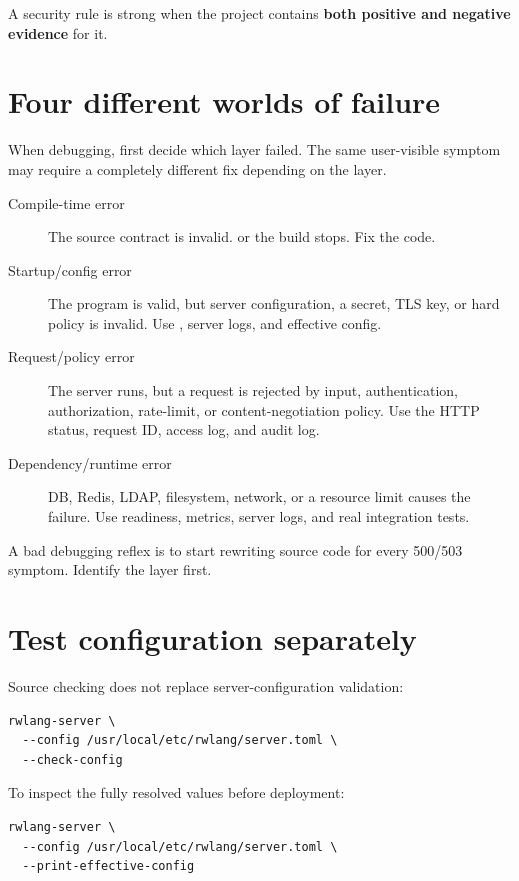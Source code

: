A security rule is strong when the project contains \textbf{both positive and negative evidence} for it.

\section{Four different worlds of failure}

When debugging, first decide which layer failed. The same user-visible symptom may require a completely different fix depending on the layer.

\begin{description}
  \item[Compile-time error] The source contract is invalid.  or the build stops. Fix the code.
  \item[Startup/config error] The program is valid, but server configuration, a secret, TLS key, or hard policy is invalid. Use , server logs, and effective config.
  \item[Request/policy error] The server runs, but a request is rejected by input, authentication, authorization, rate-limit, or content-negotiation policy. Use the HTTP status, request ID, access log, and audit log.
  \item[Dependency/runtime error] DB, Redis, LDAP, filesystem, network, or a resource limit causes the failure. Use readiness, metrics, server logs, and real integration tests.
\end{description}

A bad debugging reflex is to start rewriting source code for every 500/503 symptom. Identify the layer first.

\section{Test configuration separately}

Source checking does not replace server-configuration validation:

\begin{lstlisting}
rwlang-server \
  --config /usr/local/etc/rwlang/server.toml \
  --check-config
\end{lstlisting}

To inspect the fully resolved values before deployment:

\begin{lstlisting}
rwlang-server \
  --config /usr/local/etc/rwlang/server.toml \
  --print-effective-config
\end{lstlisting}

